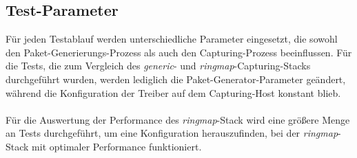 \subsection{Test-Parameter}\label{sec:test_params}
Für jeden Testablauf werden unterschiedliche Parameter eingesetzt, die sowohl
den Paket-Generierungs-Prozess als auch den Capturing-Prozess beeinflussen. Für
die Tests, die zum Vergleich des \emph{generic}- und \emph{ringmap}-Capturing-Stacks durchgeführt
wurden, werden lediglich die Paket-Generator-Parameter geändert, während die
Konfiguration der Treiber auf dem Capturing-Host konstant blieb.\\\\
Für die Auswertung der Performance des \emph{ringmap}-Stack wird eine größere 
Menge an Tests durchgeführt, um eine Konfiguration herauszufinden, bei der 
\emph{ringmap}-Stack mit optimaler Performance funktioniert.

